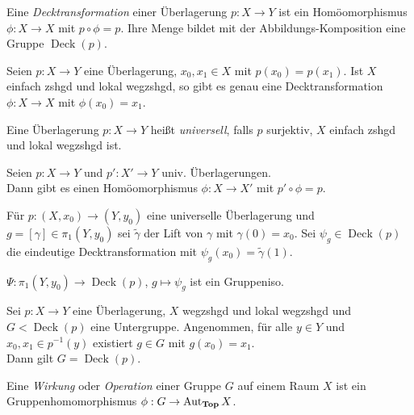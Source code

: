 \documentclass{cheat-sheet}
\DeclareMathOperator{\Deck}{Deck} %
\begin{document}
\begin{defn}
  Eine \emph{Decktransformation} einer Überlagerung $p : X \to Y$ ist ein Homöomorphismus $\phi : X \to X$ mit $p \circ \phi = p$. Ihre Menge bildet mit der Abbildungs-Komposition eine Gruppe $\Deck(p)$.
\end{defn}

\begin{kor}
  Seien $p : X \to Y$ eine Überlagerung, $x_0, x_1 \in X$ mit $p(x_0) = p(x_1)$. Ist $X$ einfach zshgd und lokal wegzshgd, so gibt es genau eine Decktransformation $\phi : X \to X$ mit $\phi(x_0) = x_1$.
\end{kor}


\begin{defn}
  Eine Überlagerung $p : X \to Y$ heißt \emph{universell}, falls $p$ surjektiv, $X$ einfach zshgd und lokal wegzshgd ist.
\end{defn}

\begin{prop}
  Seien $p : X \to Y$ und $p' : X' \to Y$ univ. Überlagerungen. \\
  Dann gibt es einen Homöomorphismus $\phi : X \to X'$ mit $p' \circ \phi = p$.
\end{prop}

Für $p : (X, x_0) \to (Y, y_0)$ eine universelle Überlagerung und $g = [\gamma] \in \pi_1(Y, y_0)$ sei $\tilde{\gamma}$ der Lift von $\gamma$ mit $\gamma(0) = x_0$. Sei $\psi_g \in \Deck(p)$ die eindeutige Decktransformation mit $\psi_g(x_0) = \tilde{\gamma}(1)$.

\begin{prop}
  $\Psi : \pi_1(Y, y_0) \to \Deck(p)$, $g \mapsto \psi_g$ ist ein Gruppeniso.
\end{prop}


\begin{prop}
  Sei $p : X \to Y$ eine Überlagerung, $X$ wegzshgd und lokal wegzshgd und $G < \Deck(p)$ eine Untergruppe. Angenommen, für alle $y \in Y$ und $x_0, x_1 \in p^{-1}(y)$ existiert $g \in G$ mit $g(x_0) = x_1$. \\
  Dann gilt $G = \Deck(p)$.
\end{prop}

\begin{defn}
  Eine \emph{Wirkung} oder \emph{Operation} einer Gruppe $G$ auf einem Raum $X$ ist ein Gruppenhomomorphismus $\phi : G \to \operatorname{Aut}_{\mathbf{Top}}{X}$.
\end{defn}
\end{document}
